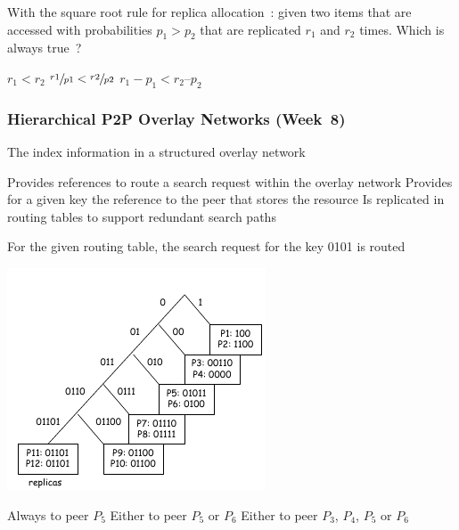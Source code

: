 \documentclass[12pt,a4paper,answers]{exam} %
\begin{document}
\begin{flushleft}
\begin{multicols*}{2}
\begin{questions}
\question With the square root rule for replica allocation~: given two items that are accessed with probabilities $p_1 > p_2$ that are replicated $r_1$ and $r_2$ times. Which is always true~?
\begin{checkboxes}
\choice $r_1 < r_2$
\CorrectChoice $\sfrac{r1}{p1} < \sfrac{r2}{p2}$
\choice $r_1 - p_1 < r_2 – p_2$
\end{checkboxes}



\subsubsection{Hierarchical P2P Overlay Networks (Week~8)}

\question The index information in a structured overlay network
\begin{checkboxes}
\CorrectChoice Provides references to route a search request within the overlay network
\choice Provides for a given key the reference to the peer that stores the resource
\choice Is replicated in routing tables to support redundant search paths
\end{checkboxes}

\question For the given routing table, the search request for the key 0101 is routed
\begin{colfig}
\centering
\includegraphics[scale=0.75]{w8_s14}
\end{colfig}

\begin{checkboxes}
\CorrectChoice Always to peer $P_5$
\choice Either to peer $P_5$ or $P_6$
\choice Either to peer $P_3$, $P_4$, $P_5$ or $P_6$
\end{checkboxes}


\end{questions}
\end{multicols*}
\end{flushleft}
\end{document}
